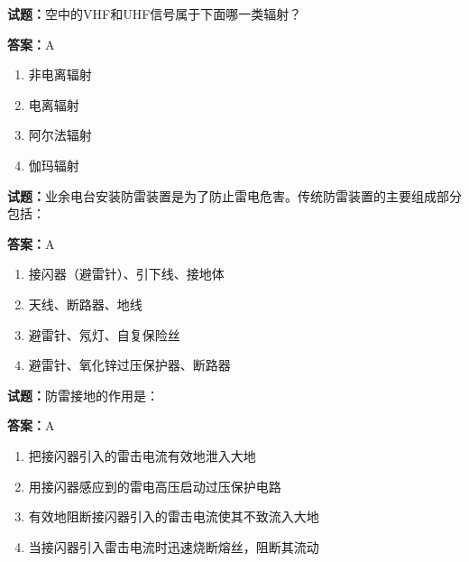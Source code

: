 \documentclass{ctexbook}
\begin{document}
\textbf{试题：}空中的VHF和UHF信号属于下面哪一类辐射？ 

\textbf{答案：}A 

\begin{enumerate}[leftmargin=3em]
  \item 非电离辐射 

  \item 电离辐射 

  \item 阿尔法辐射 

  \item 伽玛辐射 

\end{enumerate}





\vspace{1em}

\textbf{试题：}业余电台安装防雷装置是为了防止雷电危害。传统防雷装置的主要组成部分包括： 

\textbf{答案：}A 

\begin{enumerate}[leftmargin=3em]
  \item 接闪器（避雷针）、引下线、接地体 

  \item 天线、断路器、地线 

  \item 避雷针、氖灯、自复保险丝 

  \item 避雷针、氧化锌过压保护器、断路器 

\end{enumerate}





\vspace{1em}

\textbf{试题：}防雷接地的作用是： 

\textbf{答案：}A 

\begin{enumerate}[leftmargin=3em]
  \item 把接闪器引入的雷击电流有效地泄入大地 

  \item 用接闪器感应到的雷电高压启动过压保护电路 

  \item 有效地阻断接闪器引入的雷击电流使其不致流入大地 

  \item 当接闪器引入雷击电流时迅速烧断熔丝，阻断其流动 

\end{enumerate}
\end{document}
